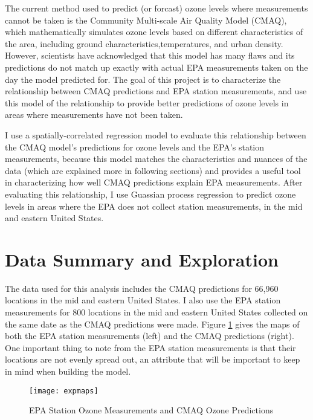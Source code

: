 \documentclass{svproc}
\begin{document}
The current method used to predict (or forcast) ozone levels where measurements cannot be taken is the Community Multi-scale Air Quality Model (CMAQ), which mathematically simulates ozone levels based on different characteristics of the area, including ground characteristics,temperatures, and urban density. However, scientists have acknowledged that this model has many flaws and its predictions do not match up exactly with actual EPA measurements taken on the day the model predicted for. The goal of this project is to characterize the relationship between CMAQ predictions and EPA station measurements, and use this model of the relationship to provide better predictions of ozone levels in areas where measurements have not been taken. 

I use a spatially-correlated regression model to evaluate this relationship between the CMAQ model's predictions for ozone levels and the EPA's station measurements, because this model matches the characteristics and nuances of the data (which are explained more in following sections) and provides a useful tool in characterizing how well CMAQ predictions explain EPA measurements. After evaluating this relationship, I use Guassian process regression to predict ozone levels in areas where the EPA does not collect station measurements, in the mid and eastern United States. 

\section{Data Summary and Exploration}

The data used for this analysis includes the CMAQ predictions for 66,960 locations in the mid and eastern United States. I also use the EPA station measurements for 800 locations in the mid and eastern United States collected on the same date as the CMAQ predictions were made. Figure \ref{expmaps} gives the maps of both the EPA station measurements (left) and the CMAQ predictions (right). One important thing to note from the EPA station measurements is that their locations are not evenly spread out, an attribute that will be important to keep in mind when building the model. 

\begin{figure}
\begin{center}
\caption{EPA Station Ozone Measurements and CMAQ Ozone Predictions}
\texttt{[image: expmaps]}
\label{expmaps}
\smallskip
\end{center}
\end{figure}
\end{document}

